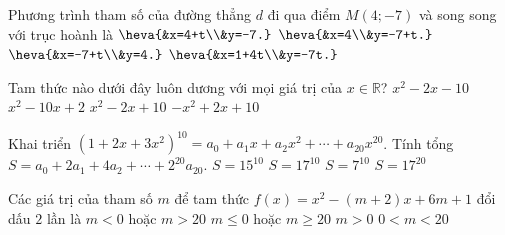 \begin{ex}%
	Phương trình tham số của đường thẳng $d$ đi qua điểm $M(4;-7)$ và song song với trục hoành là
	\def\dotEX{}
	\choice
	{$\heva{&x=4+t\\&y=-7.}$}
	{\True $\heva{&x=4\\&y=-7+t.}$}
	{$\heva{&x=-7+t\\&y=4.}$}
	{$\heva{&x=1+4t\\&y=-7t.}$}
\end{ex}

\begin{ex}%
	Tam thức nào dưới đây luôn dương với mọi giá trị của $x \in \mathbb{R}$?
	\choice
	{$x^2-2x-10$}
	{$x^2-10x+2$}
	{\True $x^2-2x+10$}
	{$-x^2+2x+10$}
\end{ex}

\begin{ex}%
	Khai triển $\left(1+2x+3x^2\right)^{10}=a_0+a_1x+a_2x^2+ \cdots +a_{20}x^{20}$. Tính tổng $S=a_0+2a_1+4a_2+ \cdots +2^{20}a_{20}$.
	\choice
	{$S=15^{10}$}
	{\True $S=17^{10}$}
	{$S=7^{10}$}
	{$S=17^{20}$}
\end{ex}

\begin{ex}%
	Các giá trị của tham số $m$ để tam thức $f(x)=x^2-(m+2)x+6m+1$ đổi dấu $2$ lần là
	\choice
	{\True $m<0$ hoặc $m>20$}
	{$m \leq 0$ hoặc $m \geq 20$}
	{$m>0$}
	{$0<m<20$}
\end{ex}

